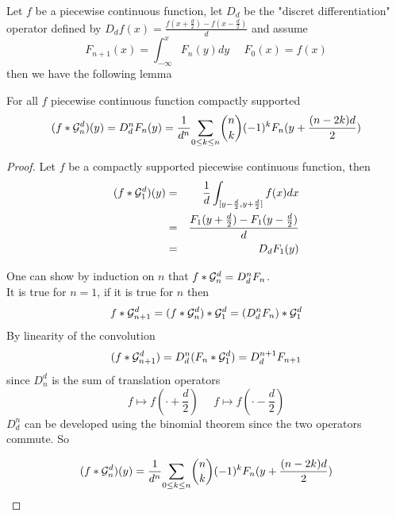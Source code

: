 Let $f$ be a piecewise continuous function, let $D_d$ be the "discret differentiation" operator defined by $D_d f(x)=\frac{f(x+\frac{d}{2})-f(x-\frac{d}{2})}{d}$ and assume
\begin{equation*}
F_{n+1}(x)= \int_{-\infty}^{x}F_{n}(y)dy~~~~~~F_{0}(x)= f(x)
\end{equation*}
then we have the following lemma

\begin{prop} For all $f$ piecewise continuous function compactly supported
\begin{equation}
 (f*\mathcal{G}_n^d)(y)=D_d^n F_{n}(y)= \frac{1}{d^n}\underset{0 \le k\le n}{\sum} \binom{n}{k}(-1)^{k} F_{n}(y+\frac{(n-2k)d}{2})
\end{equation}
\end{prop}





\begin{proof}
Let $f$ be a compactly supported piecewise continuous function, then%
\begin{eqnarray*}
(f * \mathcal{G}_1^d )(y)&=&\frac{1}{d} \int_{[y-\frac{d}{2},y+\frac{d}{2}]} f(x) dx\\
               &=&\frac{F_{1}(y+\frac{d}{2})-F_{1}(y-\frac{d}{2})}{d}\\
               &=&D_d F_{1}(y)
\end{eqnarray*}


One can show by induction on $n$ that $ f*\mathcal{G}_n^d=D_d^n F_{n}$.\\
It is true for $n=1$, if it is true for $n$ then
\begin{equation*}
f*\mathcal{G}_{n+1}^{d}=(f * \mathcal{G}_{n}^d) * \mathcal{G}_{1}^{d}= (D_d^n F_{n})*\mathcal{G}_1^d 
\end{equation*}
By linearity of the convolution
\begin{equation*}
(f*\mathcal{G}_{n+1}^{d}) = D_d^n (F_{n}*\mathcal{G}_1^d) = D_d^{n+1} F_{n+1}
\end{equation*}
since $D_n^d$ is the sum of translation operators
\begin{equation*}
f\mapsto f(\cdot+\frac{d}{2})~~~~~~f\mapsto f(\cdot-\frac{d}{2})
\end{equation*}
$D_d^n$ can be developed using the binomial theorem since the two operators commute. So

\begin{equation*}
(f*\mathcal{G}_n^d)(y) = \frac{1}{d^n}\underset{0 \le k\le n}{\sum} \binom{n}{k}(-1)^{k} F_{n}(y+\frac{(n-2k)d}{2})
\end{equation*}
\end{proof}

